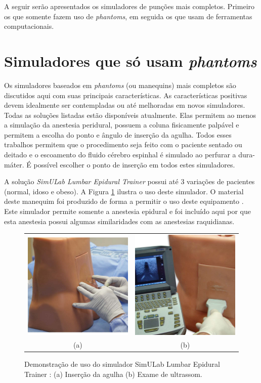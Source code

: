 A seguir serão apresentados os simuladores de punções mais completos. Primeiro os que somente fazem uso de \textit{phantoms}, em seguida os que usam de ferramentas computacionais.  

\section{Simuladores que só usam \textit{phantoms}} \label{sec:SimuladoresPhantoms}

Os simuladores baseados em \textit{phantoms} (ou manequins) mais completos são discutidos aqui com suas principais características. As características positivas devem idealmente ser contempladas ou até melhoradas em novos simuladores. Todas as soluções listadas estão disponíveis atualmente. Elas permitem ao menos a simulação da anestesia peridural, possuem a coluna fisicamente palpável e permitem a escolha do ponto e ângulo de inserção da agulha. Todos esses trabalhos permitem que o procedimento seja feito com o paciente sentado ou deitado e o escoamento do fluido cérebro espinhal é simulado ao perfurar a dura-máter. É possível escolher o ponto de inserção em todos estes simuladores.

A solução \textit{SimULab Lumbar Epidural Trainer} possui até 3 variações de pacientes (normal, idoso e obeso). A Figura \ref{fig:simuladorSimulab} ilustra o uso deste simulador. O material deste manequim foi produzido de forma a permitir o uso deste equipamento \cite{SimulabCorporation2008}. Este simulador permite somente a anestesia epidural e foi incluído aqui por que esta anestesia possui algumas similaridades com as anestesias raquidianas. 

\begin{figure}[ht!]
    \centering
        \begin{tabular}{cc}
        \includegraphics[width=0.3\linewidth]{capitulos/figuras/simulab-insercao-agulha.jpg} & 
        \includegraphics[width=0.3\linewidth]{capitulos/figuras/simulab-ultrassom.jpg} 
        \\
        (a) & (b)
        \end{tabular}
    \caption{Demonstração de uso do simulador SimULab Lumbar Epidural Trainer \cite{SimulabCorporation2008}: (a) Inserção da agulha (b) Exame de ultrassom.}
    \label{fig:simuladorSimulab}
\end{figure}

